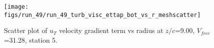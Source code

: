 \begin{figure}[H]
\centering
\texttt{[image: figs/run\_49/run\_49\_turb\_visc\_ettap\_bot\_vs\_r\_meshscatter]}
\caption{Scatter plot of $
u_T$ velocity gradient term vs radius at $z/c$=9.00, $V_{free}$=31.28, station 5.}
\end{figure}


